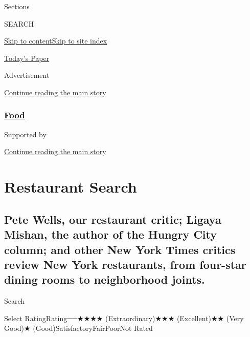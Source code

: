 Sections

SEARCH

\protect\hyperlink{site-content}{Skip to
content}\protect\hyperlink{site-index}{Skip to site index}

\href{https://myaccount.nytimes.com/auth/login?response_type=cookie\&client_id=vi}{}

\href{https://www.nytimes.com/section/todayspaper}{Today's Paper}

Advertisement

\protect\hyperlink{after-top}{Continue reading the main story}

\hypertarget{food}{%
\subsubsection{\texorpdfstring{\href{/dining}{Food}}{Food}}\label{food}}

Supported by

\protect\hyperlink{after-sponsor}{Continue reading the main story}

\hypertarget{restaurant-search}{%
\section{Restaurant Search}\label{restaurant-search}}

\hypertarget{pete-wells-our-restaurant-critic-ligaya-mishan-the-author-of-the-hungry-city-column-and-other-new-york-times-critics-review-new-york-restaurants-from-four-star-dining-rooms-to-neighborhood-joints}{%
\subsection{Pete Wells, our restaurant critic; Ligaya Mishan, the author
of the Hungry City column; and other New York Times critics review New
York restaurants, from four-star dining rooms to neighborhood
joints.}\label{pete-wells-our-restaurant-critic-ligaya-mishan-the-author-of-the-hungry-city-column-and-other-new-york-times-critics-review-new-york-restaurants-from-four-star-dining-rooms-to-neighborhood-joints}}

Search

Select RatingRating──★★★★ (Extraordinary)★★★ (Excellent)★★ (Very Good)★
(Good)SatisfactoryFairPoorNot Rated

